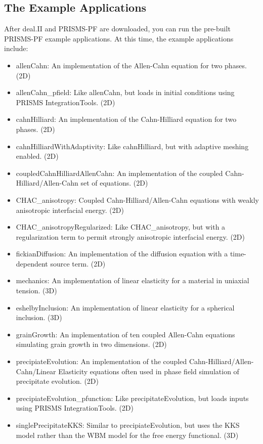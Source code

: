 \documentclass[10pt]{article} %
\begin{document}
\subsection{The Example Applications}
After deal.II and PRISMS-PF are downloaded, you can run the pre-built PRISMS-PF example applications. At this time, the example applications include:
\begin{itemize}
\item allenCahn: An implementation of the Allen-Cahn equation for two phases. (2D)
\item allenCahn\_pfield: Like allenCahn, but loads in initial conditions using PRISMS IntegrationTools. (2D)
\item cahnHilliard: An implementation of the Cahn-Hilliard equation for two phases. (2D)
\item cahnHilliardWithAdaptivity: Like cahnHilliard, but with adaptive meshing enabled. (2D)
\item coupledCahnHilliardAllenCahn: An implementation of the coupled Cahn-Hilliard/Allen-Cahn set of equations. (2D)
\item CHAC\_anisotropy: Coupled Cahn-Hilliard/Allen-Cahn equations with weakly anisotropic interfacial energy. (2D)
\item CHAC\_anisotropyRegularized: Like CHAC\_anisotropy, but with a regularization term to permit strongly anisotropic interfacial energy. (2D)
\item fickianDiffusion: An implementation of the diffusion equation with a time-dependent source term. (2D)
\item mechanics: An implementation of linear elasticity for a material in uniaxial tension. (3D)
\item eshelbyInclusion: An implementation of linear elasticity for a spherical inclusion. (3D)
\item grainGrowth: An implementation of ten coupled Allen-Cahn equations simulating grain growth in two dimensions. (2D)
\item precipiateEvolution: An implementation of the coupled Cahn-Hilliard/Allen-Cahn/Linear Elasticity equations often used in phase field simulation of precipitate evolution. (2D)
\item precipiateEvolution\_pfunction: Like precipitateEvolution, but loads inputs using PRISMS IntegrationTools. (2D)
\item singlePrecipitateKKS: Similar to precipiateEvolution, but uses the KKS model rather than the WBM model for the free energy functional. (3D)
\end{itemize}
\end{document}
